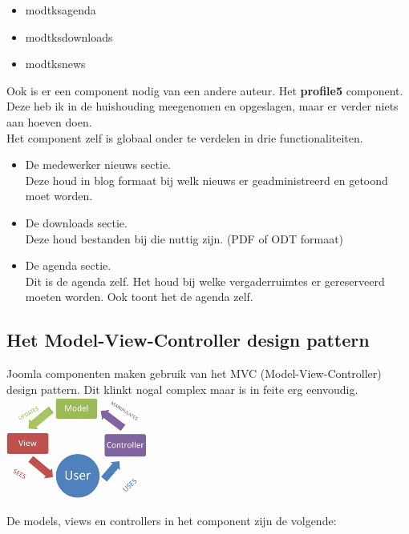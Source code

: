 \documentclass{article}
\begin{document}
\begin{itemize}
\item mod\textunderscore tks\textunderscore agenda
\item mod\textunderscore tks\textunderscore downloads
\item mod\textunderscore tks\textunderscore news
\end{itemize}

Ook is er een component nodig van een andere auteur. Het \textbf{profile5} component. Deze heb ik in de huishouding meegenomen en opgeslagen, maar er verder niets aan hoeven doen. \\

Het component zelf is globaal onder te verdelen in drie functionaliteiten. \\
\begin{itemize}
\item De medewerker nieuws sectie. \\
Deze houd in blog formaat bij welk nieuws er geadministreerd en getoond moet worden.
\item De downloads sectie. \\
Deze houd bestanden bij die nuttig zijn. (PDF of ODT formaat)
\item De agenda sectie.\\
Dit is de agenda zelf. Het houd bij welke vergaderruimtes er gereserveerd moeten worden. Ook toont het de agenda zelf.
\end{itemize}

\newpage
\subsection{Het Model-View-Controller design pattern}

Joomla componenten maken gebruik van het MVC (Model-View-Controller) design pattern. Dit klinkt nogal complex maar is in feite erg eenvoudig. \\

\includegraphics{mvc}

\bigskip
De models, views en controllers in het component zijn de volgende: \\
\end{document}

